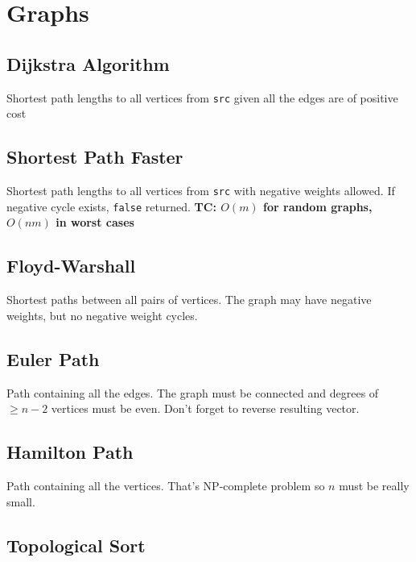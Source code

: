 \section{Graphs}

\subsection{Dijkstra Algorithm}

Shortest path lengths to all vertices from \verb|src| given all the edges are of positive cost


\subsection{Shortest Path Faster}

Shortest path lengths to all vertices from \verb|src| with negative weights allowed. If negative cycle exists, \verb|false| returned.
\bf{TC: } $O(m)$ for random graphs, $O(nm)$ in worst cases

\subsection{Floyd-Warshall}

Shortest paths between all pairs of vertices. The graph may have negative weights, but no negative weight cycles. 

\subsection{Euler Path}

Path containing all the edges. The graph must be connected and degrees of $\ge n - 2$ vertices must be even. Don't forget to reverse resulting vector.

\subsection{Hamilton Path}

Path containing all the vertices. That's NP-complete problem so $n$ must be really small. 

\subsection{Topological Sort}

